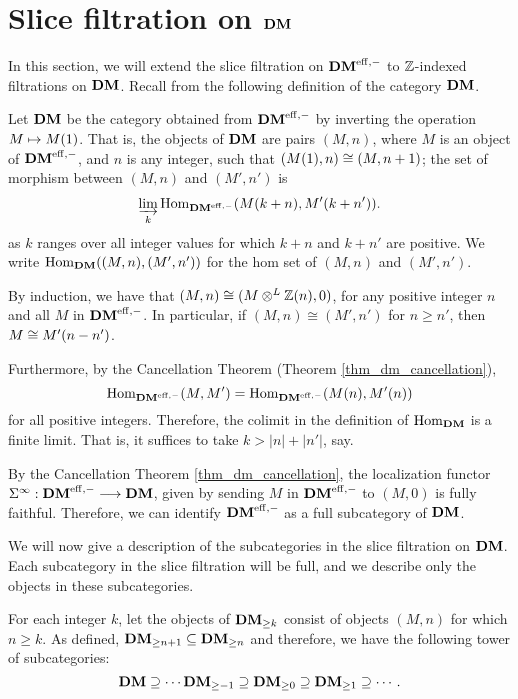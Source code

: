 \section{Slice filtration on $\DM$}
\label{sect_slice_filt_on_DM}

In this section, we will extend the slice filtration on $\DMeff$ 
to $\Z$-indexed filtrations on $\DM$. Recall from \cite[14.2]{MVW} 
the following definition of the category $\DM$.

\begin{defn}
Let $\DM$ be the category obtained from $\DMeff$ by inverting
the operation $M \mapsto \tZ{M}$. That is, the objects of $\DM$
are pairs $(M, n)$, where $M$ is an object of $\DMeff$, and $n$
is any integer, such that $(\tZ{M}, n) \cong (M, n + 1)$; the set 
of morphism between $(M, n)$ and $(M', n')$ is 
\[
\varinjlim_{k} \homDMf(\tZ[k + n]{M}, \tZ[k + n']{M'}).
\]
as $k$ ranges over all integer values for which $k + n$ and 
$k + n'$ are positive. We write $\homDM((M, n), (M',n'))$ for the 
hom set of $(M, n)$ and $(M', n')$. 
\end{defn}

By induction, we have that $(M, n) \cong (M \tDM \Z(n), 0)$, for 
any positive integer $n$ and all $M$ in $\DMeff$. In particular,
if $(M, n) \cong (M', n')$ for $n \geq n'$, then $M \cong 
\tZ[n - n']{M'}$.

Furthermore, by the Cancellation Theorem (Theorem 
\ref{thm_dm_cancellation}), 
\[
\homDMf(M, M') = \homDMf(\tZ[n]{M}, \tZ[n]{M'})
\]
for all positive integers. Therefore, the colimit in the 
definition of $\homDM$ is a finite limit. That is, it suffices to 
take $k > |n| + |n'|$, say.

By the Cancellation Theorem \ref{thm_dm_cancellation}, the
localization functor $\spectDM: \DMeff \to \DM$, given by sending $M$
in $\DMeff$ to $(M, 0)$ is fully faithful. Therefore, we can identify
$\DMeff$ as a full subcategory of $\DM$. 

We will now give a description of the subcategories in the slice
filtration on $\DM$. Each subcategory in the slice filtration 
will be full, and we describe only the objects in these 
subcategories. 

\begin{defn}\label{def_GFiltDM}
For each integer $k$, let the objects of 
$\GFiltDM[k]{\DM}$ consist of objects $(M, n)$ for which $n \geq 
k$. As defined, $\GFiltDM[n + 1]{\DM} \subseteq \GFiltDM[n]{\DM}$ 
and therefore, we have the following tower of subcategories:
\begin{equation}\label{eq_DM_slice_filt}
\DM \supseteq \cdots \GFiltDM[-1]{\DM} \supseteq \GFiltDM[0]{\DM}
   \supseteq \GFiltDM[1]{\DM} \supseteq \cdots.
\end{equation}
\end{defn}

